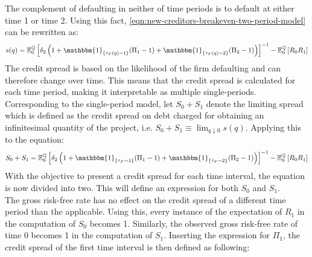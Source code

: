 \documentclass[main.tex]{subfiles}
\begin{document}
        The complement of defaulting in neither of time periods is to default at either time 1 or time 2. Using this fact, \cref{eqn:new-creditors-breakeven-two-period-model} can be rewritten as:
        \begin{equation}
            s(q) =
            \mathbb{E}_{0}^{\rnmeasure}\left[
                \delta_2\left(
                1
                + \mathbbm{1}_{\{\tau_{F}(q) = 1\}}(\Pi_1 - 1)
                + \mathbbm{1}_{\{\tau_{F}(q) = 2\}}(\Pi_2 - 1)
                \right)
            \right]^{-1} - \mathbb{E}_{0}^{\rnmeasure}\left[R_0 R_1\right]
        \end{equation}
        The credit spread is based on the likelihood of the firm defaulting and can therefore change over time.
        This means that the credit spread is calculated for each time period, making it interpretable as multiple single-periods.
        \\
        Corresponding to the single-period model,
        let $S_0 + S_1$ denote the limiting spread which is defined as the credit spread on debt charged for obtaining an infinitesimal quantity of the project,
        i.e. $S_0 + S_1 \equiv \lim_{q \downarrow 0} s(q)$.
        Applying this to the equation:
        \begin{equation}
            S_0 + S_1 =
            \mathbb{E}_{0}^{\rnmeasure}\left[
                \delta_2\left(
                1
                + \mathbbm{1}_{\{\tau_{F} = 1\}}(\Pi_1 - 1)
                + \mathbbm{1}_{\{\tau_{F} = 2\}}(\Pi_2 - 1)
                \right)
            \right]^{-1} - \mathbb{E}_{0}^{\rnmeasure}\left[R_0 R_1\right]
            \label{eqn:aggregate-credit-spread-multi-period}
        \end{equation}
        With the objective to present a credit spread for each time interval, the equation is now divided into two.
        This will define an expression for both $S_0$ and $S_1$.
        \\
        The gross risk-free rate has no effect on the credit spread of a different time period than the applicable.
        Using this, every instance of the expectation of $R_1$ in the computation of $S_0$ becomes 1.
        Similarly, the observed gross risk-free rate of time 0 becomes 1 in the computation of $S_1$.
        Inserting the expression for $\Pi_1$, the credit spread of the first time interval is then defined as following: 
\end{document}

